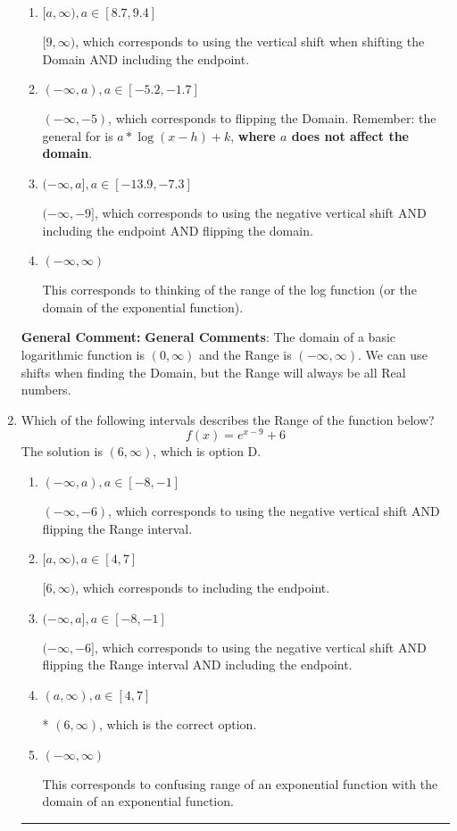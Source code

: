 \documentclass{extbook}[14pt]
\newcommand{\litem}[1]{\item #1

\rule{\textwidth}{0.4pt}}
\begin{document}
\begin{enumerate}
{\begin{enumerate}[label=\Alph*.]
* $(5, \infty)$, which is the correct option.
\item \( [a, \infty), a \in [8.7, 9.4] \)

$[9, \infty)$, which corresponds to using the vertical shift when shifting the Domain AND including the endpoint.
\item \( (-\infty, a), a \in [-5.2, -1.7] \)

$(-\infty, -5)$, which corresponds to flipping the Domain. Remember: the general for is $a*\log(x-h)+k$, \textbf{where $a$ does not affect the domain}.
\item \( (-\infty, a], a \in [-13.9, -7.3] \)

$(-\infty, -9]$, which corresponds to using the negative vertical shift AND including the endpoint AND flipping the domain.
\item \( (-\infty, \infty) \)

This corresponds to thinking of the range of the log function (or the domain of the exponential function).
\end{enumerate}

\textbf{General Comment:} \textbf{General Comments}: The domain of a basic logarithmic function is $(0, \infty)$ and the Range is $(-\infty, \infty)$. We can use shifts when finding the Domain, but the Range will always be all Real numbers.
}
\litem{
Which of the following intervals describes the Range of the function below?
\[ f(x) = e^{x-9}+6 \]The solution is \( (6, \infty) \), which is option D.\begin{enumerate}[label=\Alph*.]
\item \( (-\infty, a), a \in [-8, -1] \)

$(-\infty, -6)$, which corresponds to using the negative vertical shift AND flipping the Range interval.
\item \( [a, \infty), a \in [4, 7] \)

$[6, \infty)$, which corresponds to including the endpoint.
\item \( (-\infty, a], a \in [-8, -1] \)

$(-\infty, -6]$, which corresponds to using the negative vertical shift AND flipping the Range interval AND including the endpoint.
\item \( (a, \infty), a \in [4, 7] \)

* $(6, \infty)$, which is the correct option.
\item \( (-\infty, \infty) \)

This corresponds to confusing range of an exponential function with the domain of an exponential function.
\end{enumerate}

}
\end{enumerate}
\end{document}
